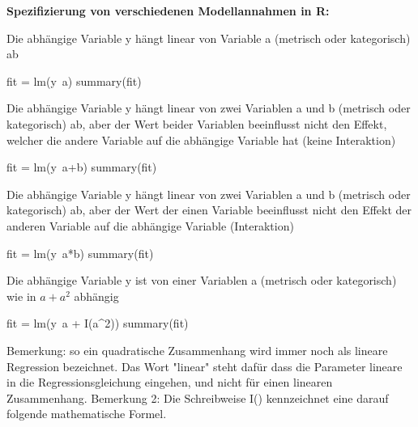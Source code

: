 \documentclass[a4paper,twoside]{tufte-book}\usepackage[]{graphicx}\usepackage[]{color}
\begin{document}
\vspace{1cm}
\begin{fullwidth}
\begin{mdframed}[backgroundcolor=black!10,rightline=false,leftline=false]
    
\textbf{Spezifizierung von verschiedenen Modellannahmen in R:} 

Die abhängige Variable y hängt linear von Variable a (metrisch oder kategorisch) ab

\begin{Schunk}
\begin{Sinput}
fit = lm(y~a)
summary(fit)
\end{Sinput}
\end{Schunk}

Die abhängige Variable y hängt linear von zwei Variablen a und b (metrisch oder kategorisch) ab, aber der Wert beider Variablen beeinflusst nicht den Effekt, welcher die andere Variable auf die abhängige Variable hat (keine Interaktion)

\begin{Schunk}
\begin{Sinput}
fit = lm(y~a+b)
summary(fit)
\end{Sinput}
\end{Schunk}

Die abhängige Variable y hängt linear von zwei Variablen a und b (metrisch oder kategorisch) ab, aber der Wert der einen Variable beeinflusst nicht den Effekt der anderen Variable auf die abhängige Variable (Interaktion)

\begin{Schunk}
\begin{Sinput}
fit = lm(y~a*b)
summary(fit)
\end{Sinput}
\end{Schunk}

Die abhängige Variable y ist von einer Variablen a (metrisch oder kategorisch) wie in $a + a^2$ abhängig

\begin{Schunk}
\begin{Sinput}
fit = lm(y~a + I(a^2))
summary(fit)
\end{Sinput}
\end{Schunk}

Bemerkung: so ein quadratische Zusammenhang wird immer noch als lineare Regression bezeichnet. Das Wort "linear" steht dafür dass die Parameter lineare in die Regressionsgleichung eingehen, und nicht für einen linearen Zusammenhang. Bemerkung 2: Die Schreibweise I() kennzeichnet eine darauf folgende mathematische Formel. 

\end{mdframed}
\end{fullwidth}
\end{document}
